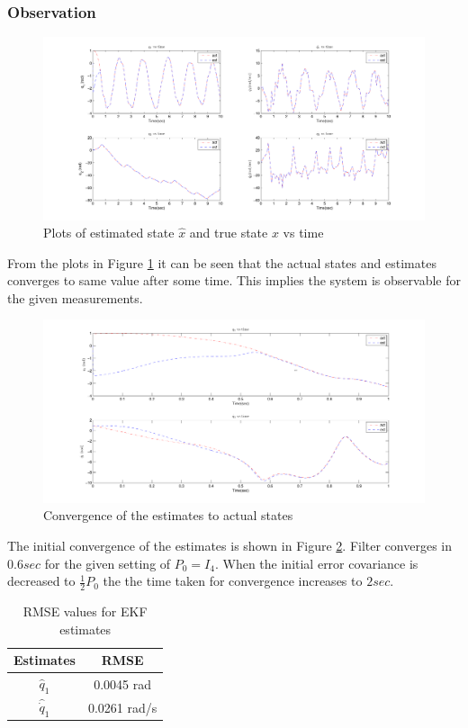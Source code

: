 \subsubsection{Observation}
\begin{figure}
	\centering
	\includegraphics[angle=90,scale=0.5]{Bilder/plots/idp/idp_plot.pdf}
	\caption{ Plots of estimated state $\hat x$ and true state $x$ vs time}
	\label{fig:idp_plot}
\end{figure}

From the plots in Figure \ref{fig:idp_plot} it can be seen that the actual states and estimates converges to same value after some time. This implies the system is observable for the given measurements. 
\begin{figure}
    \centering
    \includegraphics[trim= 30mm 0mm 30mm 0mm,clip,width=\linewidth]{Bilder/plots/idp/init_beh.pdf}
    \caption{ Convergence of the estimates to actual states }
    \label{fig:idp_init_conv}
\end{figure}
The initial convergence of the estimates is shown in Figure \ref{fig:idp_init_conv}. Filter converges in $0.6 sec$ for the given setting of $P_0=I_4$. When the initial error covariance is decreased to $\frac{1}{2}P_0$ the the time taken for convergence increases to $2 sec$. 

\begin{table}[H]
    \centering
    \begin{tabular}{|c|c|}
    \hline
    Estimates &RMSE \\ \hline
    $\hat q_1$   &0.0045 rad \\ \hline
    $\hat {\dot q}_1$ & 0.0261 rad/s \\ \hline
    \end{tabular}
    \caption{RMSE values for EKF estimates}
    \label{tab:idp_rmse_ekf}
\end{table}

